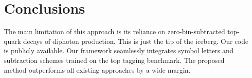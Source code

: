 \section{Conclusions}\label{sec:conclusions}

The main limitation of this approach is its reliance on
zero-bin-subtracted top-quark decays of diphoton production. This is
just the tip of the iceberg. Our code is publicly available. Our
framework seamlessly integrates symbol letters and subtraction schemes
trained on the top tagging benchmark. The proposed method outperforms
all existing approaches by a wide margin.

